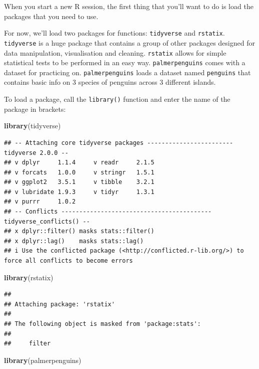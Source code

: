 \documentclass[
]{book}
\newenvironment{Shaded}{\begin{snugshade}}{\end{snugshade}}
\newcommand{\FunctionTok}[1]{\textcolor[rgb]{0.13,0.29,0.53}{\textbf{#1}}}
\newcommand{\NormalTok}[1]{#1}
\begin{document}
When you start a new R session, the first thing that you'll want to do is load the packages that you need to use.

For now, we'll load two packages for functions: \texttt{tidyverse} and \texttt{rstatix}. \texttt{tidyverse} is a huge package that contains a group of other packages designed for data manipulation, visualisation and cleaning. \texttt{rstatix} allows for simple statistical tests to be performed in an easy way. \texttt{palmerpenguins} comes with a dataset for practicing on. \texttt{palmerpenguins} loads a dataset named \texttt{penguins} that contains basic info on 3 species of penguins across 3 different islands.

To load a package, call the \texttt{library()} function and enter the name of the package in brackets:

\begin{Shaded}
\begin{Highlighting}[]
\FunctionTok{library}\NormalTok{(tidyverse)}
\end{Highlighting}
\end{Shaded}

\begin{verbatim}
## -- Attaching core tidyverse packages ------------------------ tidyverse 2.0.0 --
## v dplyr     1.1.4     v readr     2.1.5
## v forcats   1.0.0     v stringr   1.5.1
## v ggplot2   3.5.1     v tibble    3.2.1
## v lubridate 1.9.3     v tidyr     1.3.1
## v purrr     1.0.2     
## -- Conflicts ------------------------------------------ tidyverse_conflicts() --
## x dplyr::filter() masks stats::filter()
## x dplyr::lag()    masks stats::lag()
## i Use the conflicted package (<http://conflicted.r-lib.org/>) to force all conflicts to become errors
\end{verbatim}

\begin{Shaded}
\begin{Highlighting}[]
\FunctionTok{library}\NormalTok{(rstatix)}
\end{Highlighting}
\end{Shaded}

\begin{verbatim}
## 
## Attaching package: 'rstatix'
## 
## The following object is masked from 'package:stats':
## 
##     filter
\end{verbatim}

\begin{Shaded}
\begin{Highlighting}[]
\FunctionTok{library}\NormalTok{(palmerpenguins)}
\end{Highlighting}
\end{Shaded}
\end{document}
